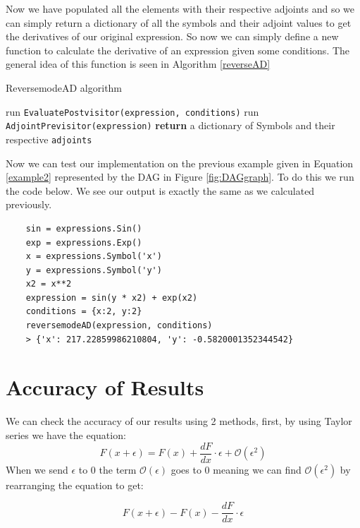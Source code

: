 \documentclass{article}
\begin{document}
Now we have populated all the elements with their respective adjoints and so we can simply return a dictionary of all the symbols and their adjoint values to get the derivatives of our original expression. So now we can simply define a new function to calculate the derivative of an expression given some conditions. The general idea of this function is seen in Algorithm \ref{reverseAD}

\begin{algorithm}[h]
\caption{ReversemodeAD algorithm}\label{reverseAD}
\begin{algorithmic}[1]
\State run \verb|EvaluatePostvisitor(expression, conditions)|
\State run \verb|AdjointPrevisitor(expression)|
\State \textbf{return} a dictionary of Symbols and their respective \verb|adjoints|
\EndProcedure
\end{algorithmic}
\end{algorithm}

Now we can test our implementation on the previous example given in Equation \ref{example2} represented by the DAG in Figure \ref{fig:DAGgraph}. To do this we run the code below. We see our output is exactly the same as we calculated previously.

\begin{verbatim}
    sin = expressions.Sin()
    exp = expressions.Exp()
    x = expressions.Symbol('x')
    y = expressions.Symbol('y')
    x2 = x**2
    expression = sin(y * x2) + exp(x2)
    conditions = {x:2, y:2}
    reversemodeAD(expression, conditions)
    > {'x': 217.22859986210804, 'y': -0.5820001352344542}
\end{verbatim}



\section{Accuracy of Results}

We can check the accuracy of our results using 2 methods, first, by using Taylor series we have the equation:
\begin{equation}
    F(x + \epsilon) = F(x) + \frac{dF}{dx} \cdot \epsilon + \mathcal{O}(\epsilon ^ 2)
\end{equation}
When we send $\epsilon$ to 0 the term $\mathcal{O}(\epsilon)$ goes to 0 meaning we can find $\mathcal{O}(\epsilon^2)$ by rearranging the equation to get:

\begin{equation}
    F(x + \epsilon) - F(x) - \frac{dF}{dx} \cdot \epsilon
\end{equation}
\end{document}
